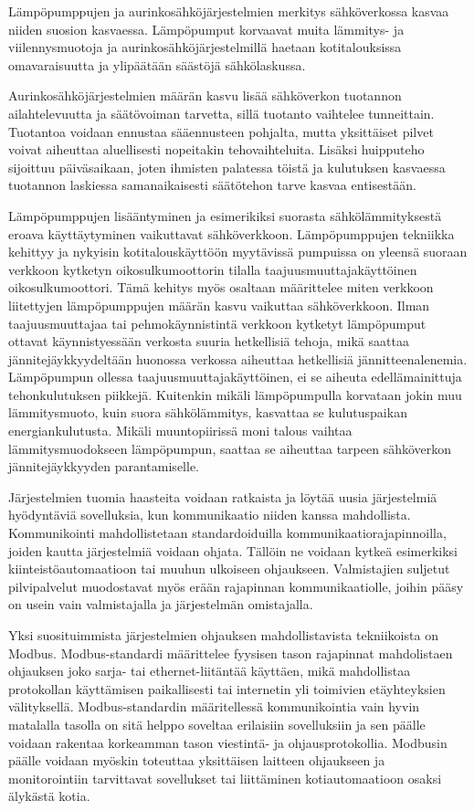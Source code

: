Lämpöpumppujen ja aurinkosähköjärjestelmien merkitys sähköverkossa kasvaa niiden suosion kasvaessa. Lämpöpumput korvaavat muita lämmitys- ja viilennysmuotoja ja aurinkosähköjärjestelmillä haetaan kotitalouksissa omavaraisuutta ja ylipäätään säästöjä sähkölaskussa.

Aurinkosähköjärjestelmien määrän kasvu lisää sähköverkon tuotannon ailahtelevuutta ja säätövoiman tarvetta, sillä tuotanto vaihtelee tunneittain. Tuotantoa voidaan ennustaa sääennusteen pohjalta, mutta yksittäiset pilvet voivat aiheuttaa aluellisesti nopeitakin tehovaihteluita. Lisäksi huipputeho sijoittuu päiväsaikaan, joten ihmisten palatessa töistä ja kulutuksen kasvaessa tuotannon laskiessa samanaikaisesti säätötehon tarve kasvaa entisestään.

Lämpöpumppujen lisääntyminen ja esimerikiksi suorasta sähkölämmityksestä eroava käyttäytyminen vaikuttavat sähköverkkoon. Lämpöpumppujen tekniikka kehittyy ja nykyisin kotitalouskäyttöön myytävissä pumpuissa on yleensä suoraan verkkoon kytketyn oikosulkumoottorin tilalla taajuusmuuttajakäyttöinen oikosulkumoottori. Tämä kehitys myös osaltaan määrittelee miten verkkoon liitettyjen lämpöpumppujen määrän kasvu vaikuttaa sähköverkkoon. Ilman taajuusmuuttajaa tai pehmokäynnistintä verkkoon kytketyt lämpöpumput ottavat käynnistyessään verkosta suuria hetkellisiä tehoja, mikä saattaa jännitejäykkyydeltään huonossa verkossa aiheuttaa hetkellisiä jännitteenalenemia. Lämpöpumpun ollessa taajuusmuuttajakäyttöinen, ei se aiheuta edellämainittuja tehonkulutuksen piikkejä. Kuitenkin mikäli lämpöpumpulla korvataan jokin muu lämmitysmuoto, kuin suora sähkölämmitys, kasvattaa se kulutuspaikan energiankulutusta. Mikäli muuntopiirissä moni talous vaihtaa lämmitysmuodokseen lämpöpumpun, saattaa se aiheuttaa tarpeen sähköverkon jännitejäykkyyden parantamiselle.

Järjestelmien tuomia haasteita voidaan ratkaista ja löytää uusia järjestelmiä hyödyntäviä sovelluksia, kun kommunikaatio niiden kanssa mahdollista. Kommunikointi mahdollistetaan standardoiduilla kommunikaatiorajapinnoilla, joiden kautta järjestelmiä voidaan ohjata. Tällöin ne voidaan kytkeä esimerkiksi kiinteistöautomaatioon tai muuhun ulkoiseen ohjaukseen. Valmistajien suljetut pilvipalvelut muodostavat myös erään rajapinnan kommunikaatiolle, joihin pääsy on usein vain valmistajalla ja järjestelmän omistajalla.

Yksi suosituimmista järjestelmien ohjauksen mahdollistavista tekniikoista on Modbus. Modbus-standardi määrittelee fyysisen tason rajapinnat mahdolistaen ohjauksen joko sarja- tai ethernet-liitäntää käyttäen, mikä mahdollistaa protokollan käyttämisen paikallisesti tai internetin yli toimivien etäyhteyksien välityksellä. Modbus-standardin määritellessä kommunikointia vain hyvin matalalla tasolla on sitä helppo soveltaa erilaisiin sovelluksiin ja sen päälle voidaan rakentaa korkeamman tason viestintä- ja ohjausprotokollia. Modbusin päälle voidaan myöskin toteuttaa yksittäisen laitteen ohjaukseen ja monitorointiin tarvittavat sovellukset tai liittäminen kotiautomaatioon osaksi älykästä kotia. 

